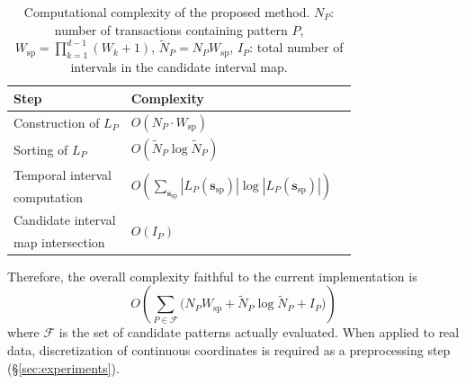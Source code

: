 \begin{table}[t]
\centering
\caption{Computational complexity of the proposed method.
$N_P$: number of transactions containing pattern $P$,
$W_{\mathrm{sp}} = \prod_{k=1}^{d-1} (W_k + 1)$,
$\widetilde N_P = N_P W_{\mathrm{sp}}$,
$I_P$: total number of intervals in the candidate interval map.}
\label{tab:complexity}
\small
\begin{tabular}{lll}
\toprule
Step & Complexity \\
\midrule
Construction of $L_P$ & $O(N_P \cdot W_{\mathrm{sp}})$ \\
Sorting of $L_P$ & $O(\widetilde N_P \log \widetilde N_P)$ \\
Temporal interval & \multirow{2}{*}{$O\!\left(\sum_{\bm{s}_{\mathrm{sp}}}|L_P(\bm{s}_{\mathrm{sp}})| \log |L_P(\bm{s}_{\mathrm{sp}})|\right)$} \\
\quad computation & \\
Candidate interval & \multirow{2}{*}{$O(I_P)$} \\
\quad map intersection & \\
\bottomrule
\end{tabular}
\end{table}

Therefore, the overall complexity
faithful to the current implementation is
\[
  O\!\left(
    \sum_{P \in \mathcal{F}}
      \bigl(
        N_P W_{\mathrm{sp}}
        +
        \widetilde N_P \log \widetilde N_P
        +
        I_P
      \bigr)
  \right)
\]
where $\mathcal{F}$ is the set of candidate patterns
actually evaluated.
When applied to real data,
discretization of continuous coordinates is required
as a preprocessing step (\S\ref{sec:experiments}).
